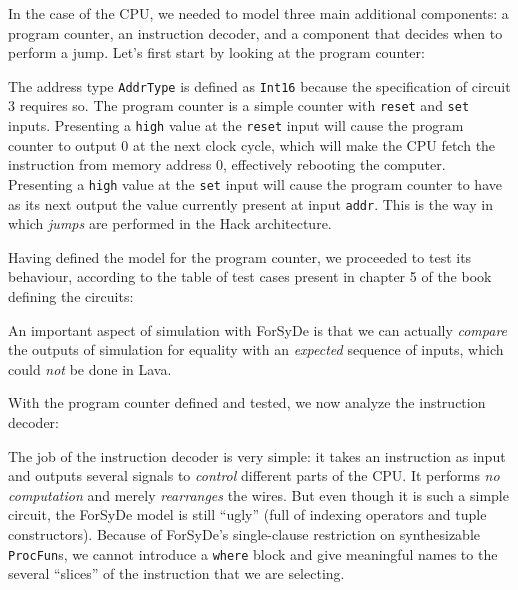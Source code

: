 \documentclass[a4paper]{article}
\begin{document}
                In the case of the CPU, we needed to model three main additional components: a
                program counter, an instruction decoder, and a component that decides when to
                perform a jump. Let's first start by looking at the program counter:


                The address type \texttt{AddrType} is defined as \texttt{Int16} because the
                specification of circuit 3 requires so. The program counter is a simple counter with
                \texttt{reset} and \texttt{set} inputs. Presenting a \texttt{high} value at the
                \texttt{reset} input will cause the program counter to output 0 at the next clock
                cycle, which will make the CPU fetch the instruction from memory address 0,
                effectively rebooting the computer. Presenting a \texttt{high} value at the
                \texttt{set} input will cause the program counter to have as its next output the
                value currently present at input \texttt{addr}. This is the way in which
                \emph{jumps} are performed in the Hack architecture.

                Having defined the model for the program counter, we proceeded to test its
                behaviour, according to the table of test cases present in chapter
                5\cite{nand2tetris-chapter-cpu} of the book defining the circuits:


                An important aspect of simulation with ForSyDe is that we can actually
                \emph{compare} the outputs of simulation for equality with an \emph{expected}
                sequence of inputs, which could \emph{not} be done in Lava.

                With the program counter defined and tested, we now analyze the instruction decoder:


                The job of the instruction decoder is very simple: it takes an instruction as input
                and outputs several signals to \emph{control} different parts of the CPU. It
                performs \emph{no computation} and merely \emph{rearranges} the wires. But even
                though it is such a simple circuit, the ForSyDe model is still ``ugly'' (full of
                indexing operators and tuple constructors). Because of ForSyDe's single-clause
                restriction on synthesizable \texttt{ProcFun}s, we cannot introduce a \texttt{where}
                block and give meaningful names to
                the several ``slices'' of the instruction that we are selecting.
\end{document}
